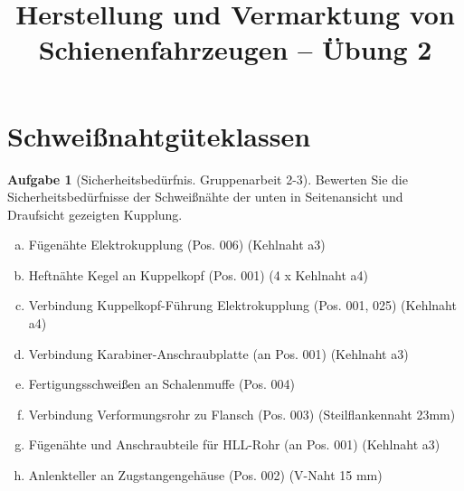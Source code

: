 \documentclass[10pt,a4paper,headsepline,smallheadings]{scrartcl}
\title{Herstellung und Vermarktung von Schienenfahrzeugen  -- \"Ubung 2}
\date{}
\theoremstyle{definition}
\newtheorem{aufgabe}{Aufgabe}
\begin{document}
\thispagestyle{empty}
\maketitle
\vspace{-2cm}

\section*{Schwei{\ss}nahtg\"uteklassen}

\begin{aufgabe}[Sicherheitsbed\"urfnis. Gruppenarbeit 2-3] 
Bewerten Sie die Sicherheitsbed\"urfnisse der Schwei{\ss}n\"ahte der unten in Seitenansicht und Draufsicht gezeigten Kupplung.

\begin{enumerate}[a)]
\item F\"ugen\"ahte Elektrokupplung (Pos. 006) (Kehlnaht a3)
\item Heftn\"ahte Kegel an Kuppelkopf (Pos. 001) (4 x Kehlnaht a4)
\item Verbindung Kuppelkopf-F\"uhrung Elektrokupplung (Pos. 001, 025) (Kehlnaht a4)
\item Verbindung Karabiner-Anschraubplatte (an Pos. 001) (Kehlnaht a3)
\item Fertigungsschwei{\ss}en an Schalenmuffe (Pos. 004)
\item Verbindung Verformungsrohr zu Flansch (Pos. 003) (Steilflankennaht 23mm)
\item F\"ugen\"ahte und Anschraubteile f\"ur HLL-Rohr (an Pos. 001) (Kehlnaht a3)
\item Anlenkteller an Zugstangengeh\"ause (Pos. 002) (V-Naht 15 mm)
\end{enumerate}

\end{aufgabe}
\vspace{.5cm}
\end{document}
